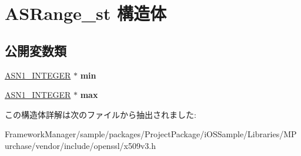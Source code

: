 \hypertarget{struct_a_s_range__st}{}\section{A\+S\+Range\+\_\+st 構造体}
\label{struct_a_s_range__st}
\subsection*{公開変数類}
\begin{DoxyCompactItemize}
\item 
\hypertarget{struct_a_s_range__st_a28c7c20c67a7a239de72908a857f83f4}{}\hyperlink{structasn1__string__st}{A\+S\+N1\+\_\+\+I\+N\+T\+E\+G\+E\+R} $\ast$ {\bfseries min}\label{struct_a_s_range__st_a28c7c20c67a7a239de72908a857f83f4}

\item 
\hypertarget{struct_a_s_range__st_a1a433ce24ae5c115b8fb4f4c5d099def}{}\hyperlink{structasn1__string__st}{A\+S\+N1\+\_\+\+I\+N\+T\+E\+G\+E\+R} $\ast$ {\bfseries max}\label{struct_a_s_range__st_a1a433ce24ae5c115b8fb4f4c5d099def}

\end{DoxyCompactItemize}


この構造体詳解は次のファイルから抽出されました\+:\begin{DoxyCompactItemize}
\item 
Framework\+Manager/sample/packages/\+Project\+Package/i\+O\+S\+Sample/\+Libraries/\+M\+Purchase/vendor/include/openssl/x509v3.\+h\end{DoxyCompactItemize}
